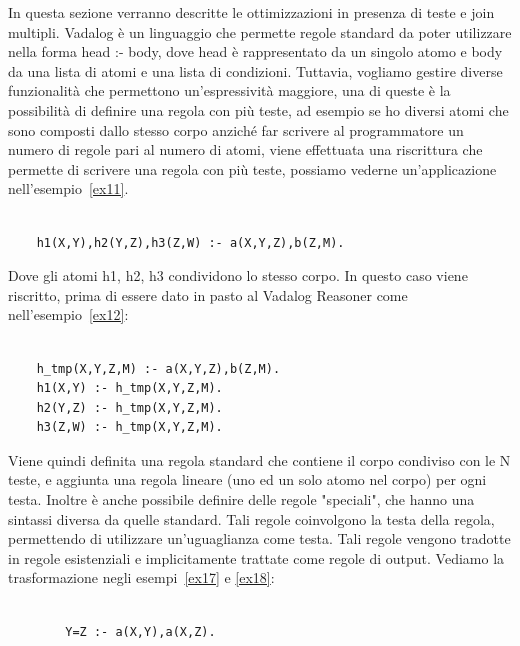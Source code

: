 In questa sezione verranno descritte le ottimizzazioni in presenza di teste e join multipli. \newline
Vadalog è un linguaggio che permette regole standard da poter utilizzare nella forma head :- body, dove head è rappresentato da un singolo atomo e body da una lista di atomi e una lista di condizioni. \newline
Tuttavia, vogliamo gestire diverse funzionalità che permettono un'espressività maggiore, una di queste è la possibilità di definire una regola con più teste, ad esempio se ho diversi atomi che sono composti dallo stesso corpo anziché far scrivere al programmatore un numero di regole pari al numero di atomi, viene effettuata una riscrittura che permette di scrivere una regola con più teste, possiamo vederne un'applicazione nell'esempio~\ref{ex11}. 
\begin{example}\label{ex11}
	\begin{lstlisting}
	
	h1(X,Y),h2(Y,Z),h3(Z,W) :- a(X,Y,Z),b(Z,M).
	\end{lstlisting}
\end{example}
Dove gli atomi h1, h2, h3 condividono lo stesso corpo. \newline
In questo caso viene riscritto, prima di essere dato in pasto al Vadalog Reasoner come nell'esempio~\ref{ex12}: 
\begin{example}\label{ex12}
	\begin{lstlisting}
	
	h_tmp(X,Y,Z,M) :- a(X,Y,Z),b(Z,M). 
	h1(X,Y) :- h_tmp(X,Y,Z,M). 
	h2(Y,Z) :- h_tmp(X,Y,Z,M). 
	h3(Z,W) :- h_tmp(X,Y,Z,M). 
	\end{lstlisting}
\end{example}
Viene quindi definita una regola standard che contiene il corpo condiviso con le N teste, e aggiunta una regola lineare (uno ed un solo atomo nel corpo) per ogni testa. \newline
Inoltre è anche possibile definire delle regole "speciali", che hanno una sintassi diversa da quelle standard. Tali regole coinvolgono la testa della regola, permettendo di utilizzare un'uguaglianza come testa. \newline
Tali regole vengono tradotte in regole esistenziali e implicitamente trattate come regole di output. Vediamo la trasformazione negli esempi~\ref{ex17} e \ref{ex18}:
\begin{example}\label{ex17}
	\begin{lstlisting}
	
		Y=Z :- a(X,Y),a(X,Z).
	\end{lstlisting}
\end{example}
